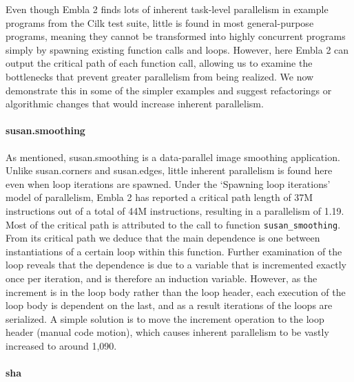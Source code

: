 Even though Embla 2 finds lots of inherent task-level parallelism in example programs from the Cilk test suite, little is found in most general-purpose programs, meaning they cannot be transformed into highly concurrent programs simply by spawning existing function calls and loops.
However, here Embla 2 can output the critical path of each function call, allowing us to examine the bottlenecks that prevent greater parallelism from being realized.
We now demonstrate this in some of the simpler examples and suggest refactorings or algorithmic changes that would increase inherent parallelism.

\paragraph{\textsf{susan.smoothing}}

As mentioned, \textsf{susan.smoothing} is a data-parallel image smoothing application.
Unlike \textsf{susan.corners} and \textsf{susan.edges}, little inherent parallelism is found here even when loop iterations are spawned.
Under the `Spawning loop iterations' model of parallelism, Embla 2 has reported a critical path length of 37M instructions out of a total of 44M instructions, resulting in a parallelism of 1.19.
Most of the critical path is attributed to the call to function \texttt{susan\_smoothing}.
From its critical path we deduce that the main dependence is one between instantiations of a certain loop within this function.
Further examination of the loop reveals that the dependence is due to a variable that is incremented exactly once per iteration, and is therefore an induction variable.
However, as the increment is in the loop body rather than the loop header, each execution of the loop body is dependent on the last, and as a result iterations of the loops are serialized.
A simple solution is to move the increment operation to the loop header (manual code motion), which causes inherent parallelism to be vastly increased to around 1,090.

\paragraph{\textsf{sha}}

